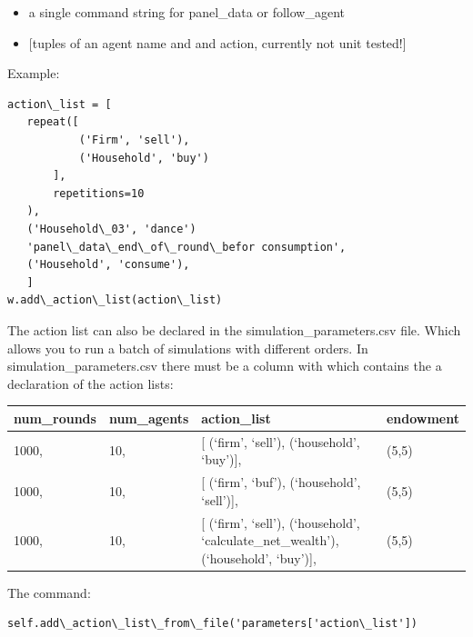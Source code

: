 \documentclass[letterpaper,10pt,english]{sphinxmanual}
\begin{document}
\begin{fulllineitems}
\begin{fulllineitems}
\begin{itemize}
\item {} 
a single command string for panel\_data or follow\_agent

\item {} 
{[}tuples of an agent name and and action, currently not unit tested!{]}

\end{itemize}

Example:

\begin{Verbatim}[commandchars=\\\{\}]
action\_list = [
   repeat([
           ('Firm', 'sell'),
           ('Household', 'buy')
       ],
       repetitions=10
   ),
   ('Household\_03', 'dance')
   'panel\_data\_end\_of\_round\_befor consumption',
   ('Household', 'consume'),
   ]
w.add\_action\_list(action\_list)
\end{Verbatim}

\end{fulllineitems}


\begin{fulllineitems}
\label{simulation:abce.Simulation.add_action_list_from_file}
The action list can also be declared in the simulation\_parameters.csv
file. Which allows you to run a batch of simulations with different
orders. In simulation\_parameters.csv there must be a column with which
contains the a declaration of the action lists:

\begin{tabulary}{\linewidth}{|L|L|L|L|}
\hline
\textbf{
num\_rounds
} & \textbf{
num\_agents
} & \textbf{
action\_list
} & \textbf{
endowment
}\\\hline

1000,
 & 
10,
 & 
{[} (`firm', `sell'), (`household', `buy'){]},
 & 
(5,5)
\\\hline

1000,
 & 
10,
 & 
{[} (`firm', `buf'), (`household', `sell'){]},
 & 
(5,5)
\\\hline

1000,
 & 
10,
 & 
{[} (`firm', `sell'),
(`household', `calculate\_net\_wealth'),
(`household', `buy'){]},
 & 
(5,5)
\\\hline
\end{tabulary}


The command:

\begin{Verbatim}[commandchars=\\\{\}]
self.add\_action\_list\_from\_file('parameters['action\_list'])
\end{Verbatim}


\end{fulllineitems}
\end{fulllineitems}
\end{document}
